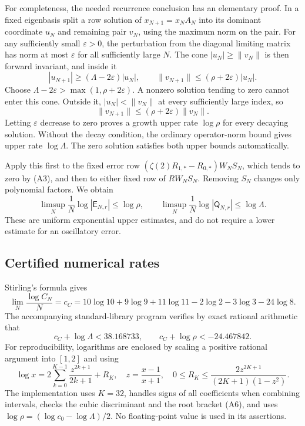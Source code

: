 \documentclass[11pt]{article}
\begin{document}
For completeness, the needed recurrence conclusion has an elementary
proof.  In a fixed eigenbasis split a row solution of
$x_{N+1}=x_NA_N$ into its dominant coordinate $u_N$ and remaining pair
$v_N$, using the maximum norm on the pair.  For any sufficiently small
$\varepsilon>0$, the perturbation from the diagonal limiting matrix
has norm at most $\varepsilon$ for all sufficiently large $N$.
The cone $|u_N|\ge\|v_N\|$ is then forward invariant, and inside it
\[
 |u_{N+1}|\ge(\Lambda-2\varepsilon)|u_N|,
 \qquad
 \|v_{N+1}\|\le(\rho+2\varepsilon)|u_N|.
\]
Choose $\Lambda-2\varepsilon>\max(1,\rho+2\varepsilon)$.
A nonzero solution tending to zero cannot enter this cone.  Outside
it, $|u_N|<\|v_N\|$ at every sufficiently large index, so
\[
 \|v_{N+1}\|\le(\rho+2\varepsilon)\|v_N\|.
\]
Letting $\varepsilon$ decrease to zero proves a growth upper rate
$\log\rho$ for every decaying solution.  Without the decay condition,
the ordinary operator-norm bound gives upper rate $\log\Lambda$.
The zero solution satisfies both upper bounds automatically.

Apply this first to the fixed error row
$(\zeta(2)R_{1,*}-R_{0,*})W_NS_N$, which tends to zero by (A3), and
then to either fixed row of $RW_NS_N$.  Removing $S_N$ changes only
polynomial factors.  We obtain
\[
 \limsup_N\frac1N\log|\mathsf E_{N,r}|\le\log\rho,
 \qquad
 \limsup_N\frac1N\log|\mathsf Q_{N,r}|\le\log\Lambda.
                                                               \tag{A7}
\]
These are uniform exponential upper estimates, and do not require a
lower estimate for an oscillatory error.

\subsection{Certified numerical rates}
Stirling's formula gives
\[
 \lim_N\frac{\log C_N}{N}
 =c_C=10\log10+9\log9+11\log11
          -2\log2-3\log3-24\log8.
\]
The accompanying standard-library program verifies by exact rational
arithmetic that
\[
 c_C+\log\Lambda<38.168733,
 \qquad c_C+\log\rho<-24.467842.                           \tag{A8}
\]
For reproducibility, logarithms are enclosed by scaling a positive
rational argument into $[1,2]$ and using
\[
 \log x=2\sum_{k=0}^{K-1}\frac{z^{2k+1}}{2k+1}+R_K,
 \quad z=\frac{x-1}{x+1},\quad
 0\le R_K\le\frac{2z^{2K+1}}{(2K+1)(1-z^2)}.
\]
The implementation uses $K=32$, handles signs of all coefficients
when combining intervals, checks the cubic discriminant and the root
bracket (A6), and uses $\log\rho=(\log c_0-\log\Lambda)/2$.
No floating-point value is used in its assertions.
\end{document}
